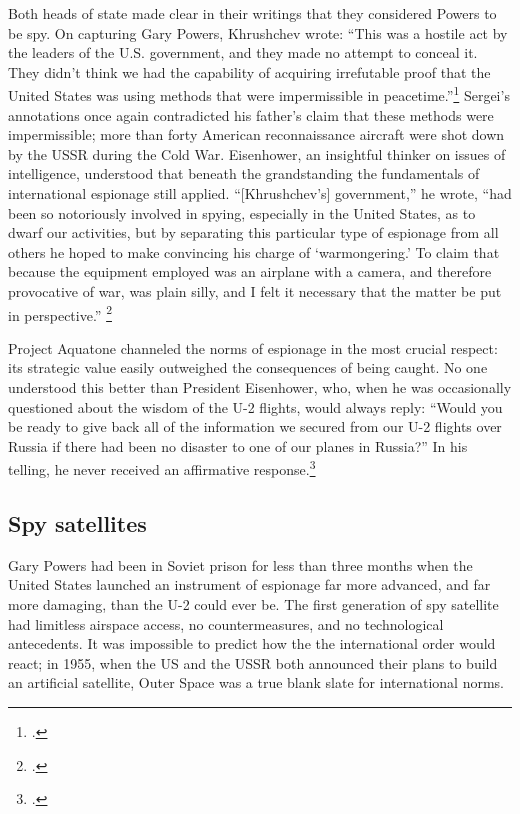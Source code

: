 \documentclass[14pt]{extarticle}
\begin{document}
Both heads of state made clear in their writings that they considered Powers to be spy. On capturing Gary Powers, Khrushchev wrote: ``This was a hostile act by the leaders of the U.S. government, and they made no attempt to conceal it. They didn't think we had the capability of \textelp{} acquiring irrefutable proof that the United States was using methods that were impermissible in peacetime.''\footcite[p.~239]{khrushchev_memoirs_2007} Sergei's annotations once again contradicted his father's claim that these methods were impermissible; more than forty American reconnaissance aircraft were shot down by the USSR during the Cold War. Eisenhower, an insightful thinker on issues of intelligence, understood that beneath the grandstanding the fundamentals of international espionage still applied. \enquote{[Khrushchev's] government,} he wrote, \enquote{had been so notoriously involved in spying, especially in the United States, as to dwarf our activities, but by separating this particular type of espionage from all others he hoped to make convincing his charge of \enquote{warmongering.} To claim that because the equipment employed was an airplane with a camera, and therefore provocative of war, was plain silly, and I felt it necessary that the matter be put in perspective.} \footcite[p.~551]{eisenhower_waging_1965}


Project Aquatone channeled the norms of espionage in the most crucial respect: its strategic value easily outweighed the consequences of being caught. No one understood this better than President Eisenhower, who, when he was occasionally questioned about the wisdom of the U-2 flights, would always reply: \enquote{Would you be ready to give back all of the information we secured from our U-2 flights over Russia if there had been no disaster to one of our planes in Russia?} In his telling, he never received an affirmative response.\footcite[p.~559]{eisenhower_waging_1965}


\subsection{Spy satellites}
Gary Powers had been in Soviet prison for less than three months when the United States launched an instrument of espionage far more advanced, and far more damaging, than the U-2 could ever be. The first generation of spy satellite had limitless airspace access, no countermeasures, and no technological antecedents. It was impossible to predict how the the international order would react; in 1955, when the US and the USSR both announced their plans to build an artificial satellite, Outer Space was a true blank slate for international norms.
\end{document}
